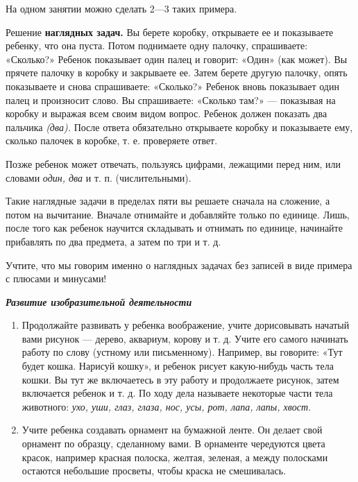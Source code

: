 \documentclass{book}
\renewcommand{\emph}[1]{\textit{#1}}
\begin{document}
На одном занятии можно сделать 2---3 таких примера.

Решение \textbf{наглядных задач.} Вы берете коробку, открываете ее и
показываете ребенку, что она пуста. Потом поднимаете одну палочку,
спрашиваете: «Сколько?» Ребенок показывает один палец и говорит: «Один»
(как может). Вы прячете палочку в коробку и закрываете ее. Затем берете
другую палочку, опять показываете и снова спрашиваете: «Сколько?»
Ребенок вновь показывает один палец и произносит слово. Вы спрашиваете:
«Сколько там?» --- показывая на коробку и выражая всем своим видом
вопрос. Ребенок должен показать два пальчика \emph{(два).} После ответа
обязательно открываете коробку и показываете ему, сколько палочек в
коробке, т. е. проверяете ответ.

Позже ребенок может отвечать, пользуясь цифрами, лежащими перед ним, или
словами \emph{один, два} и т. п. (числительными).

Такие наглядные задачи в пределах пяти вы решаете сначала на сложение, а
потом на вычитание. Вначале отнимайте и добавляйте только по единице.
Лишь, после того как ребенок научится складывать и отнимать по единице,
начинайте прибавлять по два предмета, а затем по три и т. д.

Учтите, что мы говорим именно о наглядных задачах без записей в виде
примера с плюсами и минусами!

\emph{\textbf{Развитие изобразительной деятельности}}


\begin{enumerate}
\def\labelenumi{\arabic{enumi}.}
\item
  
  Продолжайте развивать у ребенка воображение, учите дорисовывать
  начатый вами рисунок --- дерево, аквариум, корову и т. д. Учите его
  самого начинать работу по слову (устному или письменному). Например,
  вы говорите: «Тут будет кошка. Нарисуй кошку», и ребенок рисует
  какую-нибудь часть тела кошки. Вы тут же включаетесь в эту работу и
  продолжаете рисунок, затем включается ребенок и т. д. По ходу дела
  называете некоторые части тела животного: \emph{ухо, уши, глаз, глаза,
  нос, усы, рот, лапа, лапы, хвост.}
  
\item
  
  Учите ребенка создавать орнамент на бумажной ленте. Он делает свой
  орнамент по образцу, сделанному вами. В орнаменте чередуются цвета
  красок, например красная полоска, желтая, зеленая, а между полосками
  остаются небольшие просветы, чтобы краска не смешивалась.
  
\end{enumerate}
\end{document}
